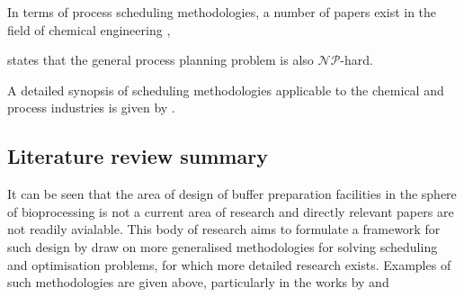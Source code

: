 In terms of process scheduling methodologies, a number of papers exist in the 
field of chemical engineering \citep{Ahmed:2000},

\citet{Ahmed:2000} states that the general process planning problem is also
$\mathcal{NP}$-hard.

A detailed synopsis of scheduling methodologies applicable to the chemical 
and process industries is given by \citet{Harjunkoski:2014}.

\subsection{Literature review summary}\label{litsum}
It can be seen that the area of design of buffer preparation facilities in the
sphere of bioprocessing is not a current area of research and directly relevant
papers are not readily avialable. This body of research aims to formulate a 
framework for such design by draw on more generalised methodologies for solving
scheduling and optimisation problems, for which more detailed research exists.
Examples of such methodologies are given above, particularly in the works by
\citep{Harjunkoski:2014} and \citet{Korte:2012}
